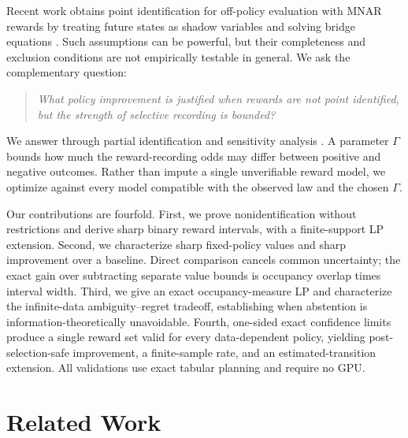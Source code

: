 \documentclass[letterpaper]{article}
\theoremstyle{remark}
\begin{document}
Recent work obtains point identification for off-policy evaluation with MNAR rewards by treating future states as shadow variables and solving bridge equations \citep{wei2026mnar}. Such assumptions can be powerful, but their completeness and exclusion conditions are not empirically testable in general. We ask the complementary question:
\begin{quote}
\emph{What policy improvement is justified when rewards are not point identified, but the strength of selective recording is bounded?}
\end{quote}

We answer through partial identification and sensitivity analysis \citep{manski2003partial,rosenbaum2002observational}. A parameter $\Gamma$ bounds how much the reward-recording odds may differ between positive and negative outcomes. Rather than impute a single unverifiable reward model, we optimize against every model compatible with the observed law and the chosen $\Gamma$.

Our contributions are fourfold. First, we prove nonidentification without restrictions and derive sharp binary reward intervals, with a finite-support LP extension. Second, we characterize sharp fixed-policy values and sharp improvement over a baseline. Direct comparison cancels common uncertainty; the exact gain over subtracting separate value bounds is occupancy overlap times interval width. Third, we give an exact occupancy-measure LP and characterize the infinite-data ambiguity--regret tradeoff, establishing when abstention is information-theoretically unavoidable. Fourth, one-sided exact confidence limits produce a single reward set valid for every data-dependent policy, yielding post-selection-safe improvement, a finite-sample rate, and an estimated-transition extension. All validations use exact tabular planning and require no GPU.

\section{Related Work}
\end{document}

